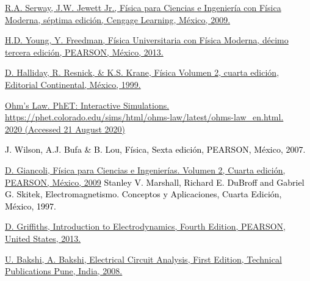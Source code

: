 \documentclass[a4paper,10pt]{article}
\begin{document}
\begin{multicols}{2}
\begin{thebibliography}{}
\textcolor{MiColor2}{\protect\href{http://www.labvirfis.com/textos/serway1.pdf}{ R.A. Serway, J.W. Jewett Jr., Física para Ciencias e Ingeniería con Física Moderna, séptima edición, Cengage Learning, México, 2009.}} \par
{}\textcolor{MiColor2}{\protect\href{https://www.u-cursos.cl/usuario/42103e5ee2ce7442a3921d69b0200c93/mi_blog/r/Fisica_General_-_Fisica_Universitaria_Vol_2__ed_12\%28Sears-Zemansky\%29.pdf}{H.D. Young, Y. Freedman, Física Universitaria con Física Moderna, décimo tercera edición, PEARSON, México, 2013.}} \par
{}\textcolor{MiColor2}{\protect\href{http://www.fulviofrisone.com/attachments/article/485/Resnick-Fisica\%20Vol\%202.pdf}{D. Halliday, R. Resnick, \& K.S. Krane, Física Volumen 2, cuarta edición, Editorial Continental, México, 1999.}} \par
{}\textcolor{MiColor2}{\protect\href{https://phet.colorado.edu/sims/html/ohms-law/latest/ohms-law\_en.html}{Ohm's Law. PhET: Interactive Simulations. \\ https://phet.colorado.edu/sims/html/ohms-law/latest/ohms-law\_en.html. \\ 2020 (Accessed 21 August 2020)}} \par
{}\textcolor{Black}{J. Wilson, A.J. Bufa \& B. Lou, Física, Sexta edición, PEARSON, México, 2007.} \par
{}\textcolor{MiColor2}{\protect\href{http://esystems.mx/BPC/llyfrgell/0296.pdf}{D. Giancoli, Física para Ciencias e Ingenierías. Volumen 2, Cuarta edición, PEARSON, México, 2009}}
\textcolor{Black}{Stanley V. Marshall, Richard E. DuBroff and Gabriel G. Skitek, Electromagnetismo. Conceptos y Aplicaciones, Cuarta Edición, México, 1997.} \par
{}\textcolor{MiColor2}{\protect\href{http://profesores.dcb.unam.mx/users/raulpm/teoem/griffiths.pdf}{D. Griffiths, Introduction to Electrodynamics, Fourth Edition, PEARSON, United States, 2013.}} \par
{}\textcolor{MiColor2}{\protect\href{https://books.google.com.mx/books?id=GXJ2tfECwV0C\&printsec=frontcover\&hl=es\#v=onepage\&q\&f=false}{U. Bakshi, A. Bakshi, Electrical Circuit Analysis, First Edition, Technical Publications Pune, India, 2008.}}

\end{thebibliography}

\end{multicols}
\end{document}
